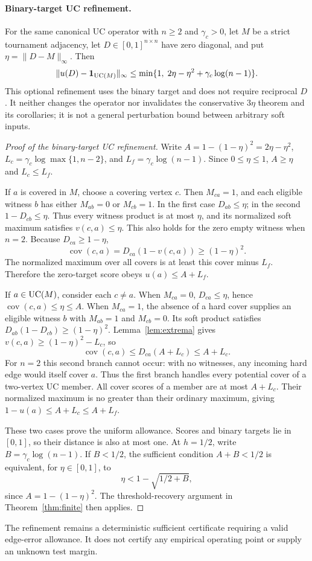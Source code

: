 \paragraph{Binary-target UC refinement.}\label{rem:uc-binary-refinement}
For the same canonical UC operator with $n\ge2$ and $\gamma_c>0$, let $M$ be a strict tournament adjacency, let $D\in[0,1]^{n\times n}$ have zero diagonal, and put $\eta=\|D-M\|_\infty$. Then
\[
\|u(D)-\mathbf1_{\mathrm{UC}(M)}\|_\infty
\le\min\{1,\;2\eta-\eta^2+\gamma_c\log(n-1)\}.
\]
This optional refinement uses the binary target and does not require reciprocal $D$. It neither changes the operator nor invalidates the conservative $3\eta$ theorem and its corollaries; it is not a general perturbation bound between arbitrary soft inputs.
\begin{proof}[Proof of the binary-target UC refinement]
Write $A=1-(1-\eta)^2=2\eta-\eta^2$, $L_c=\gamma_c\log\max\{1,n-2\}$, and $L_f=\gamma_c\log(n-1)$. Since $0\le\eta\le1$, $A\ge\eta$ and $L_c\le L_f$.

If $a$ is covered in $M$, choose a covering vertex $c$. Then $M_{ca}=1$, and each eligible witness $b$ has either $M_{ab}=0$ or $M_{cb}=1$. In the first case $D_{ab}\le\eta$; in the second $1-D_{cb}\le\eta$. Thus every witness product is at most $\eta$, and its normalized soft maximum satisfies $v(c,a)\le\eta$. This also holds for the zero empty witness when $n=2$. Because $D_{ca}\ge1-\eta$,
\[
\operatorname{cov}(c,a)=D_{ca}(1-v(c,a))\ge(1-\eta)^2.
\]
The normalized maximum over all covers is at least this cover minus $L_f$. Therefore the zero-target score obeys $u(a)\le A+L_f$.

If $a\in\mathrm{UC}(M)$, consider each $c\ne a$. When $M_{ca}=0$, $D_{ca}\le\eta$, hence $\operatorname{cov}(c,a)\le\eta\le A$. When $M_{ca}=1$, the absence of a hard cover supplies an eligible witness $b$ with $M_{ab}=1$ and $M_{cb}=0$. Its soft product satisfies
$D_{ab}(1-D_{cb})\ge(1-\eta)^2$.
Lemma~\ref{lem:extrema} gives $v(c,a)\ge(1-\eta)^2-L_c$, so
\[
\operatorname{cov}(c,a)\le D_{ca}(A+L_c)\le A+L_c.
\]
For $n=2$ this second branch cannot occur: with no witnesses, any incoming hard edge would itself cover $a$. Thus the first branch handles every potential cover of a two-vertex UC member. All cover scores of a member are at most $A+L_c$. Their normalized maximum is no greater than their ordinary maximum, giving $1-u(a)\le A+L_c\le A+L_f$.

These two cases prove the uniform allowance. Scores and binary targets lie in $[0,1]$, so their distance is also at most one. At $h=1/2$, write $B=\gamma_c\log(n-1)$. If $B<1/2$, the sufficient condition $A+B<1/2$ is equivalent, for $\eta\in[0,1]$, to
\[
\eta<1-\sqrt{1/2+B},
\]
since $A=1-(1-\eta)^2$. The threshold-recovery argument in Theorem~\ref{thm:finite} then applies.
\end{proof}
The refinement remains a deterministic sufficient certificate requiring a valid edge-error allowance. It does not certify any empirical operating point or supply an unknown test margin.

